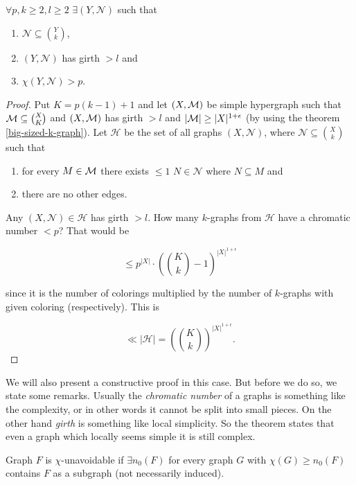 \begin{cor}
	$\forall p, k \geq 2, l \geq 2$ $\exists (Y, \mathcal{N})$ such that
	
	\begin{enumerate}
		\item $\mathcal{N} \subseteq \binom{Y}{k}$,
		\item $(Y, \mathcal{N})$ has girth $> l$ and
		\item $\chi(Y, \mathcal{N}) > p$.
	\end{enumerate}
	\label{chromatic-girth}
\end{cor}

\begin{proof}
	Put $K = p (k-1) + 1$ and let $(X, \mathcal{M})$ be simple hypergraph such that $\mathcal{M} \subseteq \binom{X}{K}$ and $(X, \mathcal{M})$ has girth $> l$ and $|\mathcal{M}| \geq |X|^{1+\epsilon}$ (by using the theorem \ref{big-sized-k-graph}). Let $\mathcal{H}$ be the set of all graphs $(X, \mathcal{N})$, where $\mathcal{N} \subseteq \binom{X}{k}$ such that
	
	\begin{enumerate}
		\item for every $M \in \mathcal{M}$ there exists $\leq 1$ $N \in \mathcal{N}$ where $N \subseteq M$ and
		\item there are no other edges.
	\end{enumerate}
	
	\noindent Any $(X, \mathcal{N}) \in \mathcal{H}$ has girth $> l$. How many $k$-graphs from $\mathcal{H}$ have a chromatic number $< p$? That would be
	
	$$
	\leq p^{|X|} \cdot \left(\binom{K}{k} - 1\right)^{|X|^{1 + \epsilon}}
	$$
		
	\noindent since it is the number of colorings multiplied by the number of $k$-graphs with given coloring (respectively). This is
	
	$$
	\ll |\mathcal{H}| = \left(\binom{K}{k}\right)^{|X|^{1 + \epsilon}}.
	$$
\end{proof}

We will also present a constructive proof in this case. But before we do so, we state some remarks. Usually the \textit{chromatic number} of a graphs is something like the complexity, or in other words it cannot be split into small pieces. On the other hand \textit{girth} is something like local simplicity. So the theorem states that even a graph which locally seems simple it is still complex.

\begin{defn}
	Graph $F$ is $\chi$-unavoidable if $\exists n_0(F)$ for every graph $G$ with $\chi(G) \geq n_0(F)$ contains $F$ as a subgraph (not necessarily induced).
\end{defn}

